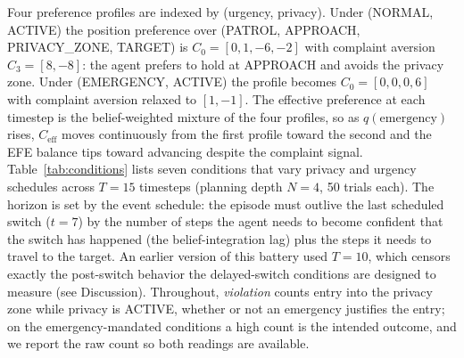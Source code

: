 \documentclass[10pt,twocolumn]{article}
\begin{document}
\begin{table}[H]
\centering
\scriptsize
{}
\caption{Seven experimental conditions. Privacy switches at $t = 7$; urgency switches at $t = 4$. C7 is the condition we built the experiment around: emergency onset precedes privacy suspension, so the agent must decide whether to override active privacy constraints based on inferred urgency, with no known schedule to rely on.}
\label{tab:conditions}
\end{table}

Four preference profiles are indexed by (urgency, privacy). Under (NORMAL, ACTIVE) the position preference over (PATROL, APPROACH, PRIVACY\_ZONE, TARGET) is $C_0 = [0, 1, -6, -2]$ with complaint aversion $C_3 = [8, -8]$: the agent prefers to hold at APPROACH and avoids the privacy zone. Under (EMERGENCY, ACTIVE) the profile becomes $C_0 = [0, 0, 0, 6]$ with complaint aversion relaxed to $[1, -1]$. The effective preference at each timestep is the belief-weighted mixture of the four profiles, so as $q(\text{emergency})$ rises, $C_{\text{eff}}$ moves continuously from the first profile toward the second and the EFE balance tips toward advancing despite the complaint signal. Table~\ref{tab:conditions} lists seven conditions that vary privacy and urgency schedules across $T = 15$ timesteps (planning depth $N = 4$, 50 trials each). The horizon is set by the event schedule: the episode must outlive the last scheduled switch ($t = 7$) by the number of steps the agent needs to become confident that the switch has happened (the belief-integration lag) plus the steps it needs to travel to the target. An earlier version of this battery used $T = 10$, which censors exactly the post-switch behavior the delayed-switch conditions are designed to measure (see Discussion). Throughout, \textit{violation} counts entry into the privacy zone while privacy is ACTIVE, whether or not an emergency justifies the entry; on the emergency-mandated conditions a high count is the intended outcome, and we report the raw count so both readings are available.
\end{document}
